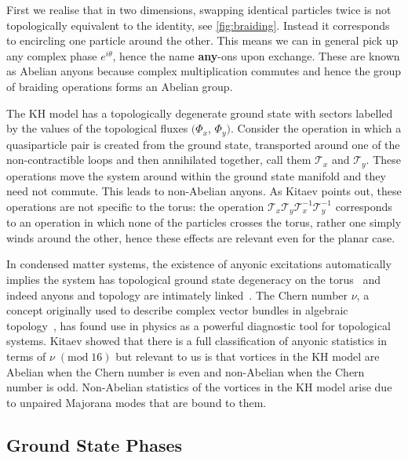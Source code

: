 First we realise that in two dimensions, swapping identical particles twice is not topologically equivalent to the identity, see \cref{fig:braiding}. Instead it corresponds to encircling one particle around the other. This means we can in general pick up any complex phase \(e^{i\theta}\), hence the name \textbf{any}-ons upon exchange. These are known as Abelian anyons because complex multiplication commutes and hence the group of braiding operations forms an Abelian group.

The KH model has a topologically degenerate ground state with sectors labelled by the values of the topological fluxes \((\Phi_x\), \(\Phi_y)\). Consider the operation in which a quasiparticle pair is created from the ground state, transported around one of the non-contractible loops and then annihilated together, call them \(\mathcal{T}_{x}\) and \(\mathcal{T}_{y}\). These operations move the system around within the ground state manifold and they need not commute. This leads to non-Abelian anyons. As Kitaev points out, these operations are not specific to the torus: the operation \(\mathcal{T}_{x}\mathcal{T}_{y}\mathcal{T}_{x}^{-1}\mathcal{T}_{y}^{-1}\) corresponds to an operation in which none of the particles crosses the torus, rather one simply winds around the other, hence these effects are relevant even for the planar case.

In condensed matter systems, the existence of anyonic excitations automatically implies the system has topological ground state degeneracy on the torus~\autocite{einarssonFractionalStatisticsTorus1990} and indeed anyons and topology are intimately linked~\autocite{oshikawaTopologicalDegeneracyNonAbelian2007,Chung_Topological_quantum2010,yaoAlgebraicSpinLiquid2009}. The Chern number \(\nu\), a concept originally used to describe complex vector bundles in algebraic topology~\autocite{chernCharacteristicClassesHermitian1946}, has found use in physics as a powerful diagnostic tool for topological systems. Kitaev showed that there is a full classification of anyonic statistics in terms of \(\nu\;(\mathrm{mod}\;16)\) but relevant to us is that vortices in the KH model are Abelian when the Chern number is even and non-Abelian when the Chern number is odd. Non-Abelian statistics of the vortices in the KH model arise due to unpaired Majorana modes that are bound to them.

\hypertarget{ground-state-phases}{%
\subsection{Ground State Phases}\label{ground-state-phases}}

